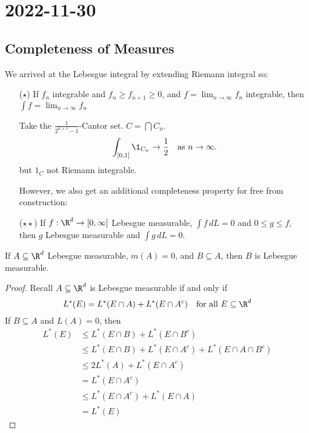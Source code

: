 \section{2022-11-30}

\subsection{Completeness of Measures}

We arrived at the Lebesgue integral by extending Riemann integral so:
\begin{itemize}
	\item[($\star$)] If $f_n$ integrable and $f_n \geq f_{n+1} \geq 0$, and $f = \lim_{n\to \infty} f_n$ integrable, then $\int f = \lim_{n \to \infty} f_n$

\begin{example}
	Take the $\frac{1}{2^{n+1} - 1}$-Cantor set.
	$C = \bigcap C_n$.
	 \[
		 \int_{[0,1]} \1_{C_n} \to \frac{1}{2} \quad \text{as } n \to \infty.
	\]
	but $1_{C}$ not Riemann integrable.
\end{example}

However, we also get an additional completeness property for free from construction:

\item[($\star \star$)] If $f : \R^d \to [0,\infty]$ Lebesgue measurable, $\int f \, dL = 0$ and $0 \leq g \leq f$, then $g$ Lebesgue measurable and $\int g \, dL = 0$.
\end{itemize}

\begin{lemma}
	If $A \subseteq \R^d$ Lebesgue measurable, $m(A) = 0$, and $B \subseteq  A$, then $B$ is Lebesgue measurable.
\end{lemma}

\begin{proof}
	Recall $A \subseteq \R^d$ is Lebesgue measurable if and only if
	\[
		L^*(E) = L^*(E \cap A) + L^* (E \cap A^c) \quad \text{for all } E \subseteq \R^d
	\]
	If $B \subseteq A$ and $L(A) = 0$, then
	\begin{align*}
		L^*(E) &\leq L^*(E \cap B) + L^*(E \cap B^c) \\
			   &\leq L^*(E \cap B) + L^*(E \cap A^c) + L^*(E \cap A \cap B^c) \\
			   &\leq 2 L^*(A) + L^*(E \cap A^c) \\
				 &= L^* (E \cap A^c) \\
			   &\leq L^*(E \cap A^c) + L^*(E \cap A) \\
			   &= L^*(E)
	\end{align*}
\end{proof}

